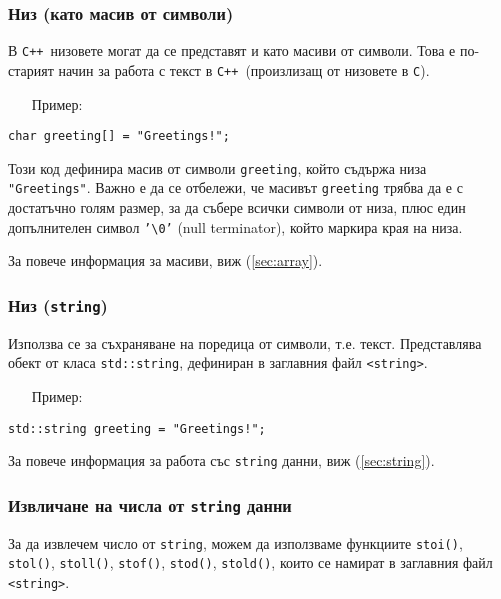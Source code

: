 \documentclass[oneside]{book}
\newcommand*{\code}[1]{\texttt{#1}}
\newcommand*{\cpp}{\texttt{C++}\ }
\newcommand*{\bs}{\textbackslash}
\begin{document}
\subsubsection{Низ (като масив от символи)}
В \cpp низовете могат да се представят и като масиви от символи. Това е по-старият начин за работа с текст в \cpp (произлизащ от низовете в \code{C}).

\begin{itemize}\item[Пример:]\end{itemize}
\begin{mdframed}\begin{lstlisting}
char greeting[] = "Greetings!";
\end{lstlisting}\end{mdframed}

Този код дефинира масив от символи \code{greeting}, който съдържа низа \\\code{"Greetings"}. Важно е да се отбележи, че масивът \code{greeting} трябва да е с достатъчно голям размер, за да събере всички символи от низа, плюс един допълнителен символ \code{'\bs{0}'} (null terminator), който маркира края на низа.

За повече информация за масиви, виж (\ref{sec:array}).

\subsubsection{Низ (\code{string})}
Използва се за съхраняване на поредица от символи, т.е. текст. Представлява обект от класа \code{std::string}, дефиниран в заглавния файл \code{<string>}.

\begin{itemize}\item[Пример:]\end{itemize}
\begin{mdframed}\begin{lstlisting}
std::string greeting = "Greetings!";
\end{lstlisting}\end{mdframed}

За повече информация за работа със \code{string} данни, виж (\ref{sec:string}).

\subsubsection{Извличане на числа от \code{string} данни}
За да извлечем число от \code{string}, можем да използваме функциите \code{stoi()}, \code{stol()}, \code{stoll()}, \code{stof()}, \code{stod()}, \code{stold()}, които се намират в заглавния файл \code{<string>}.
\end{document}
